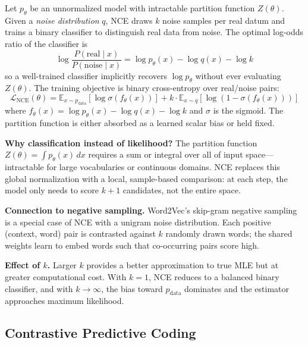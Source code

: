 \documentclass[11pt, letterpaper]{article}
\begin{document}
\begin{concept}
    Let \(p_\theta\) be an unnormalized model with intractable partition function \(Z(\theta)\). Given a \textit{noise distribution} \(q\), NCE draws \(k\) noise samples per real datum and trains a binary classifier to distinguish real data from noise. The optimal log-odds ratio of the classifier is
    \[
        \log \frac{P(\text{real} \mid x)}{P(\text{noise} \mid x)} = \log p_\theta(x) - \log q(x) - \log k
    \]
    so a well-trained classifier implicitly recovers \(\log p_\theta\) without ever evaluating \(Z(\theta)\). The training objective is binary cross-entropy over real/noise pairs:
    \[
        \mathcal{L}_{\text{NCE}}(\theta) = \mathbb{E}_{x \sim p_{\text{data}}}[\log \sigma(f_\theta(x))] + k \cdot \mathbb{E}_{x \sim q}[\log(1 - \sigma(f_\theta(x)))]
    \]
    where \(f_\theta(x) = \log p_\theta(x) - \log q(x) - \log k\) and \(\sigma\) is the sigmoid. The partition function is either absorbed as a learned scalar bias or held fixed.
\end{concept}

\begin{remark}
    \textbf{Why classification instead of likelihood?} The partition function \(Z(\theta) = \int p_\theta(x)\,dx\) requires a sum or integral over all of input space---intractable for large vocabularies or continuous domains. NCE replaces this global normalization with a local, sample-based comparison: at each step, the model only needs to score \(k+1\) candidates, not the entire space.

    \textbf{Connection to negative sampling.} Word2Vec's skip-gram negative sampling is a special case of NCE with a unigram noise distribution. Each positive (context, word) pair is contrasted against \(k\) randomly drawn words; the shared weights learn to embed words such that co-occurring pairs score high.

    \textbf{Effect of \(k\).} Larger \(k\) provides a better approximation to true MLE but at greater computational cost. With \(k = 1\), NCE reduces to a balanced binary classifier, and with \(k \to \infty\), the bias toward \(p_{\text{data}}\) dominates and the estimator approaches maximum likelihood.
\end{remark}

\subsection{Contrastive Predictive Coding}
\end{document}
